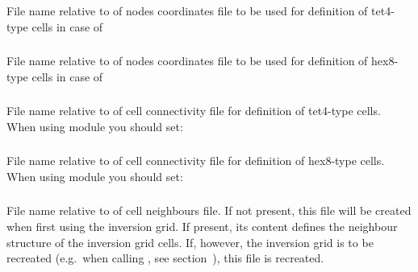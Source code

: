 \subsubsection{}
File name relative to  of nodes coordinates file to be used
for definition of tet4-type cells in case of \\
\subsubsection{}
File name relative to  of nodes coordinates file to be used
for definition of hex8-type cells in case of \\
\subsubsection{}
File name relative to  of cell connectivity file for 
definition of tet4-type cells.\\
When using module  you should set:\\
\subsubsection{}
File name relative to  of cell connectivity file for 
definition of hex8-type cells.\\
When using module  you should set:\\
\subsubsection{}
File name relative to  of cell neighbours file. If not
present, this file will be created when first using the inversion grid. If present, its content defines 
the neighbour structure of the inversion grid cells. If, however, the inversion grid
is to be recreated (e.g.\ when calling , see section~),
this file is recreated.
